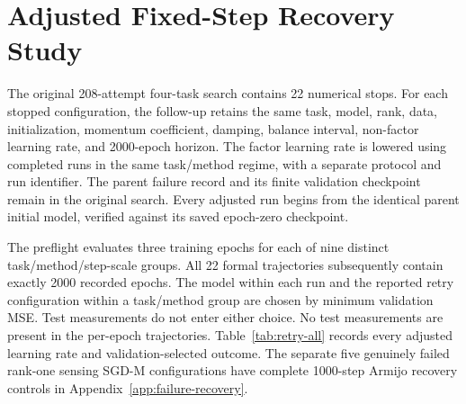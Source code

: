 \section{Adjusted Fixed-Step Recovery Study}
\label{app:failure-retry}
The original 208-attempt four-task search contains 22 numerical stops.
For each stopped configuration, the follow-up retains the same task,
model, rank, data, initialization, momentum coefficient, damping,
balance interval, non-factor learning rate, and 2000-epoch horizon.
The factor learning rate is lowered using completed runs in the same
task/method regime, with a separate protocol and run identifier.
The parent failure record and its finite validation checkpoint remain
in the original search. Every adjusted run begins from the identical
parent initial model, verified against its saved epoch-zero checkpoint.

The preflight evaluates three training epochs for each of nine distinct
task/method/step-scale groups. All 22 formal trajectories subsequently
contain exactly 2000 recorded epochs. The model within each run and the
reported retry configuration within a task/method group are chosen by
minimum validation MSE. Test measurements do not enter either choice.
No test measurements are present in the per-epoch trajectories.
Table~\ref{tab:retry-all} records every adjusted learning rate and
validation-selected outcome. The separate five genuinely failed
rank-one sensing SGD-M configurations have complete 1000-step Armijo
recovery controls in Appendix~\ref{app:failure-recovery}.


